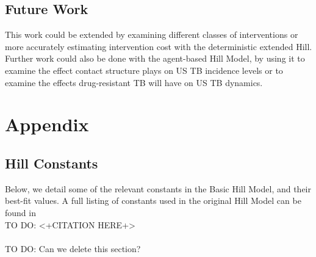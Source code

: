 \documentclass{amsart}
\newcommand{\TODO}[1]{\hfill\\{\huge \color{red} TO DO:} #1 \hfill \\}
\begin{document}
\subsection{Future Work}
This work could be extended by examining different classes of interventions or
more accurately estimating intervention cost with the deterministic extended
Hill. Further work could also be done with the agent-based Hill Model, by using
it to examine the effect contact structure plays on US TB incidence levels or to
examine the effects drug-resistant TB will have on US TB dynamics. 

\section{Appendix} 
\subsection{Hill Constants}
\label{subsec:hillConstants}
Below, we detail some of the relevant constants in the Basic Hill Model, and
their best-fit values. A full listing of constants used in the original Hill
Model can be found in \TODO{<+CITATION HERE+>} \TODO{Can we delete this
section?}
\end{document}
